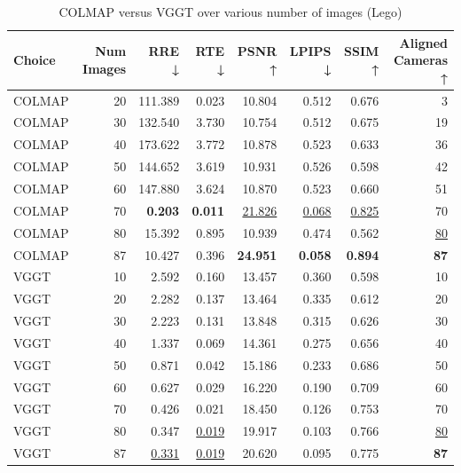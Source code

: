 \begin{table}[H]
\caption{COLMAP versus VGGT over various number of images (Lego)}
\label{tab:01_num_images_lego}
\small
\begin{tabular}{lrrrrrrr}
\toprule
Choice & Num Images & RRE ↓ & RTE ↓ & PSNR ↑ & LPIPS ↓ & SSIM ↑ & Aligned Cameras ↑ \\
\midrule
COLMAP & 20 & 111.389 & 0.023 & 10.804 & 0.512 & 0.676 & 3 \\
COLMAP & 30 & 132.540 & 3.730 & 10.754 & 0.512 & 0.675 & 19 \\
COLMAP & 40 & 173.622 & 3.772 & 10.878 & 0.523 & 0.633 & 36 \\
COLMAP & 50 & 144.652 & 3.619 & 10.931 & 0.526 & 0.598 & 42 \\
COLMAP & 60 & 147.880 & 3.624 & 10.870 & 0.523 & 0.660 & 51 \\
COLMAP & 70 & \textbf{0.203} & \textbf{0.011} & \underline{21.826} & \underline{0.068} & \underline{0.825} & 70 \\
COLMAP & 80 & 15.392 & 0.895 & 10.939 & 0.474 & 0.562 & \underline{80} \\
COLMAP & 87 & 10.427 & 0.396 & \textbf{24.951} & \textbf{0.058} & \textbf{0.894} & \textbf{87} \\
VGGT & 10 & 2.592 & 0.160 & 13.457 & 0.360 & 0.598 & 10 \\
VGGT & 20 & 2.282 & 0.137 & 13.464 & 0.335 & 0.612 & 20 \\
VGGT & 30 & 2.223 & 0.131 & 13.848 & 0.315 & 0.626 & 30 \\
VGGT & 40 & 1.337 & 0.069 & 14.361 & 0.275 & 0.656 & 40 \\
VGGT & 50 & 0.871 & 0.042 & 15.186 & 0.233 & 0.686 & 50 \\
VGGT & 60 & 0.627 & 0.029 & 16.220 & 0.190 & 0.709 & 60 \\
VGGT & 70 & 0.426 & 0.021 & 18.450 & 0.126 & 0.753 & 70 \\
VGGT & 80 & 0.347 & \underline{0.019} & 19.917 & 0.103 & 0.766 & \underline{80} \\
VGGT & 87 & \underline{0.331} & \underline{0.019} & 20.620 & 0.095 & 0.775 & \textbf{87} \\
\bottomrule
\end{tabular}
\end{table}